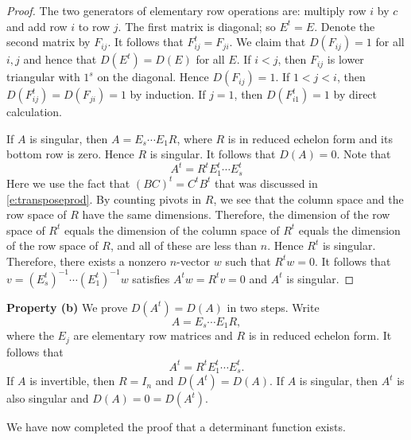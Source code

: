 \documentclass{ximera}
\begin{document}
\begin{proof}
The two generators of elementary row operations are: multiply row $i$ 
by $c$ and add row $i$ to row $j$. The first matrix is diagonal; so 
$E^t = E$.  Denote the second matrix by $F_{ij}$.  It follows that 
$F_{ij}^t = F_{ji}$.   We claim that $D(F_{ij})=1$ for all $i,j$ and hence 
that $D(E^t) = D(E)$ for all $E$. If $i<j$, then $F_{ij}$ is lower triangular 
with $1^s$ on the diagonal.  Hence $D(F_{ij})=1$.  If $1<j<i$, then 
$D(F_{ij}^t) = D(F_{ji}) = 1$ by induction.  If $j=1$, then $D(F_{i1}^t) = 1$ 
by direct calculation. 

If $A$ is singular, then $A=E_s\cdots E_1R$, where $R$ is in reduced 
echelon form and its bottom row is zero. Hence $R$ is singular. It follows 
that $D(A) = 0$. Note that 
\[
A^t = R^t E_1^t\cdots E_s^t
\] 
Here we use the fact that $(BC)^t= C^tB^t$ that was discussed in \eqref{e:transposeprod}.  
By counting pivots in $R$, we see that the column space and the row space 
of $R$ have the same dimensions.  Therefore, the dimension of the row 
space of $R^t$ equals the dimension of the column space of $R^t$ equals 
the dimension of the row space of $R$, and all of these are less than $n$. 
Hence $R^t$ is singular.  Therefore, there exists a nonzero $n$-vector $w$ such that 
$R^tw=0$.  It follows that $v = (E_s^t)^{-1}\cdots (E_1^t)^{-1} w$ satisfies 
$A^tw = R^tv = 0$ and $A^t$ is singular.
\end{proof}


{\bf Property (b)} We prove $D(A^t)=D(A)$ in two steps.  Write   
\begin{equation}  \label{e:Adecomp}
A=E_s\cdots E_1 R,
\end{equation}
where the $E_j$ are elementary row matrices and $R$ is in reduced echelon form.  It follows that 
\begin{equation}  \label{e:Atdecomp}
A^t = R^t E_1^t \cdots E_s^t.  
\end{equation}
If $A$ is invertible, then $R=I_n$ and $D(A^t) = D(A)$.  If $A$ is singular, then $A^t$ is also singular and  $D(A)=0=D(A^t)$. 

We have now completed the proof that a determinant function exists. 
\end{document}
